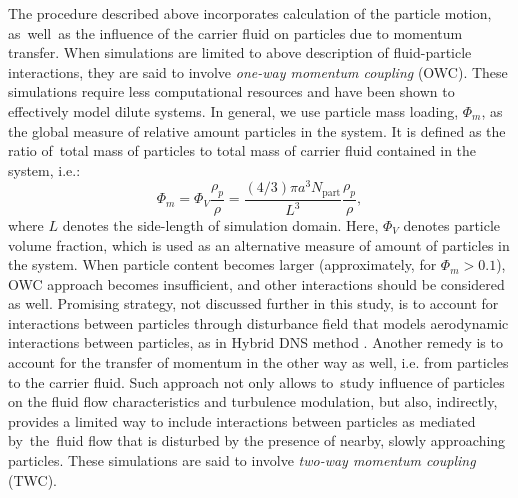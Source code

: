 \documentclass{pracamgren}
\begin{document}
The procedure described above incorporates calculation of the particle motion, as~well~as the influence of the carrier fluid on particles due to momentum transfer.
When simulations are limited to above description of fluid-particle interactions, they are said to involve \emph{one-way momentum coupling} (OWC).
These simulations require less computational resources and have been shown to effectively model dilute systems.
In general, we use particle mass loading, $\Phi_{m}$, as the global measure of relative amount particles in the system.
It is defined as the ratio of~total mass of particles to total mass of carrier fluid contained in the system, i.e.:
\begin{equation}
\Phi_m = \Phi_V \frac{\rho_p}{\rho} = \frac{(4/3) \pi a^3 N_{\text{part}}}{L^3} \frac{\rho_p}{\rho} ,
\label{eqn:phim}
\end{equation}
where $L$ denotes the side-length of simulation domain.
Here, $\Phi_V$ denotes particle volume fraction, which is used as an alternative measure of amount of particles in the system.
When particle content becomes larger (approximately, for $\Phi_m > 0.1$), OWC approach becomes insufficient, and other interactions should be considered as well.
Promising strategy, not discussed further in this study, is to account for interactions between particles through disturbance field that models aerodynamic interactions between particles, as in Hybrid DNS method \parencite[see e.g.][]{Ayala2014}.
Another remedy is to account for the transfer of momentum in the other way as well, i.e. from particles to the carrier fluid.
Such approach not only allows to~study influence of particles on the fluid flow characteristics and turbulence modulation, but also, indirectly, provides a limited way to include interactions between particles as mediated by~the~fluid flow that is disturbed by the presence of nearby, slowly approaching particles.
These simulations are said to involve \emph{two-way momentum coupling} (TWC).
\end{document}
